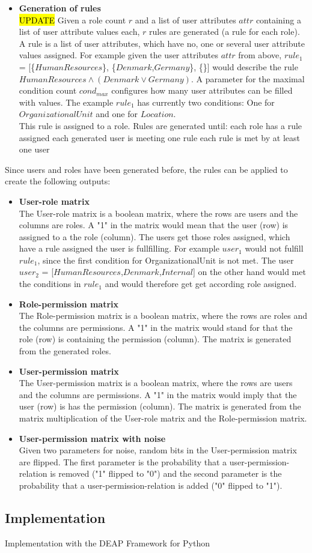 \begin{itemize}
	\item \textbf{Generation of rules}\\
	\hl{UPDATE}
	Given a role count $r$ and a list of user attributes $attr$ containing a list of user attribute values each, $r$ rules are generated (a rule for each role). A rule is a list of user attributes, which have no, one or several user attribute values assigned. For example given the user attributes $attr$ from above, $rule_1$ = [\{$HumanResources$\}, \{$Denmark$,$Germany$\}, \{\}] would describe the rule $HumanResources \wedge (Denmark \vee Germany)$. A parameter for the maximal condition count $cond_{max}$ configures how many user attributes can be filled with values. The example $rule_1$ has currently two conditions: One for $OrganizationalUnit$ and one for $Location$.\\
	This rule is assigned to a role. Rules are generated until:
	\subitem \textbullet \space each role has a rule assigned
	\subitem \textbullet \space each generated user is meeting one rule
	\subitem \textbullet \space each rule is met by at least one user
\end{itemize}
Since users and roles have been generated before, the rules can be applied to create the following outputs:
\begin{itemize}
	\item \textbf{User-role matrix}\\
	The User-role matrix is a boolean matrix, where the rows are users and the columns are roles. A "1" in the matrix would mean that the user (row) is assigned to a the role (column). The users get those roles assigned, which have a rule assigned the user is fullfilling. For example $user_1$ would not fulfill $rule_1$, since the first condition for OrganizationalUnit is not met. The user $user_2$ = [$HumanResources$,$Denmark$,$Internal$] on the other hand would met the conditions in $rule_1$ and would therefore get get according role assigned.
	\item \textbf{Role-permission matrix}\\
	The Role-permission matrix is a boolean matrix, where the rows are roles and the columns are permissions. A "1" in the matrix would stand for that the role (row) is containing the permission (column). The matrix is generated from the generated roles.
	\item \textbf{User-permission matrix}\\
	The User-permission matrix is a boolean matrix, where the rows are users and the columns are permissions. A "1" in the matrix would imply that the user (row) is has the permission (column). The matrix is generated from the matrix multiplication of the User-role matrix and the Role-permission matrix.
	\item \textbf{User-permission matrix with noise}\\
	Given two parameters for noise, random bits in the User-permission matrix are flipped. The first parameter is the probability that a user-permission-relation is removed ("1" flipped to "0") and the second parameter is the probability that a user-permission-relation is added ("0" flipped to "1").
\end{itemize}

\subsection{Implementation}
Implementation with the DEAP Framework for Python \cite{DeRainville:2012}